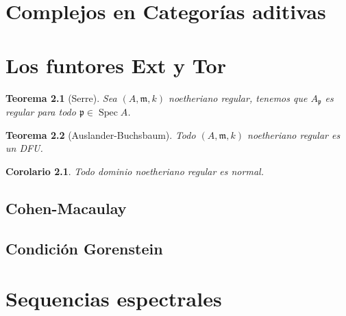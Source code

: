 \documentclass[12pt]{book}
\newtheorem{teo}{Teorema}
\newtheorem{cor}{Corolario}
\begin{document}
\chapter{Complejos en Categorías aditivas}



\chapter{Los funtores Ext y Tor}

\begin{teo}[Serre]
Sea $(A, \mathfrak{m},k)$ noetheriano regular, tenemos que $A_\mathfrak{p}$ es regular para todo $\mathfrak{p} \in \operatorname{Spec}A$.
\end{teo}

\begin{teo}[Auslander-Buchsbaum]
Todo $(A, \mathfrak{m},k)$ noetheriano regular es un DFU.
\end{teo}


\begin{cor}
Todo dominio noetheriano regular es normal.
\end{cor}



\section{Cohen-Macaulay}

\section{Condición Gorenstein}



\chapter{Sequencias espectrales}
\end{document}
